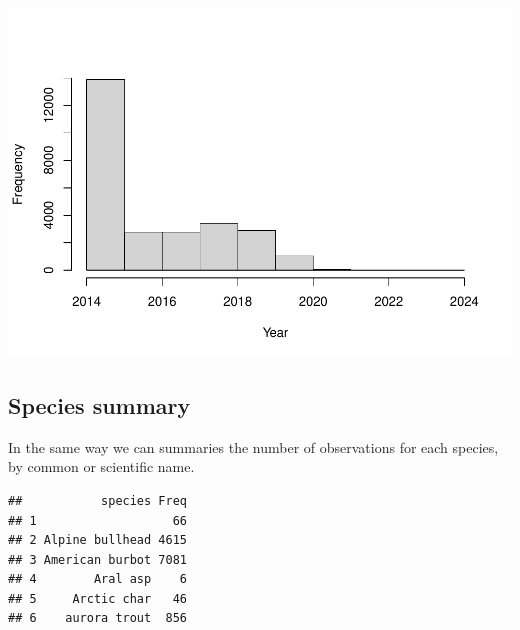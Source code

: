\documentclass[
  10pt,
]{article}
\newenvironment{Shaded}{\begin{snugshade}}{\end{snugshade}}
\newcommand{\DecValTok}[1]{\textcolor[rgb]{0.00,0.00,0.81}{#1}}
\newcommand{\FunctionTok}[1]{\textcolor[rgb]{0.00,0.00,0.00}{#1}}
\newcommand{\NormalTok}[1]{#1}
\newcommand{\OtherTok}[1]{\textcolor[rgb]{0.56,0.35,0.01}{#1}}
\newcommand{\SpecialCharTok}[1]{\textcolor[rgb]{0.00,0.00,0.00}{#1}}
\newcommand{\StringTok}[1]{\textcolor[rgb]{0.31,0.60,0.02}{#1}}
\begin{document}
\includegraphics{r-tools-tutorial_files/figure-latex/timeHist-1.pdf}

\hypertarget{species-summary}{%
\subsection{Species summary}\label{species-summary}}

In the same way we can summaries the number of observations for each species, by common or scientific name.

\begin{Shaded}
\end{Shaded}

\begin{verbatim}
##           species Freq
## 1                   66
## 2 Alpine bullhead 4615
## 3 American burbot 7081
## 4        Aral asp    6
## 5     Arctic char   46
## 6    aurora trout  856
\end{verbatim}

\begin{Shaded}
\end{Shaded}
\end{document}
